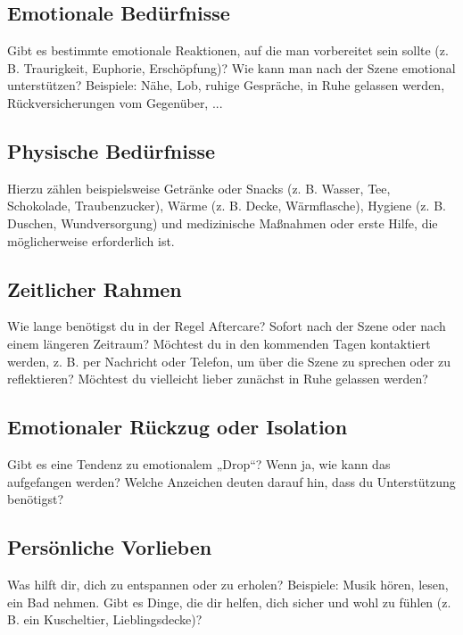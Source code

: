 \documentclass[a4paper,12pt]{article}
\begin{document}
\subsection{Emotionale Bedürfnisse}
\noindent Gibt es bestimmte emotionale Reaktionen, auf die man vorbereitet sein sollte (z. B. Traurigkeit, Euphorie, Erschöpfung)? Wie kann man nach der Szene emotional unterstützen? Beispiele: Nähe, Lob, ruhige Gespräche, in Ruhe gelassen werden, Rückversicherungen vom Gegenüber, ... \newline
\noindent \TextField[name=AftercareEmotional,multiline=true,height=7em, width=37em]{}

\subsection{Physische Bedürfnisse}
\noindent Hierzu zählen beispielsweise Getränke oder Snacks (z. B. Wasser, Tee, Schokolade, Traubenzucker), Wärme (z. B. Decke, Wärmflasche), Hygiene (z. B. Duschen, Wundversorgung) und medizinische Maßnahmen oder erste Hilfe, die möglicherweise erforderlich ist. \newline
\noindent \TextField[name=AftercarePhysisch,multiline=true,height=7em, width=37em]{}

\subsection{Zeitlicher Rahmen}
\noindent Wie lange benötigst du in der Regel Aftercare? Sofort nach der Szene oder nach einem längeren Zeitraum? Möchtest du in den kommenden Tagen kontaktiert werden, z. B. per Nachricht oder Telefon, um über die Szene zu sprechen oder zu reflektieren? Möchtest du vielleicht lieber zunächst in Ruhe gelassen werden? \newline
\noindent \TextField[name=AftercareZeitlich,multiline=true,height=7em, width=37em]{}

\subsection{Emotionaler Rückzug oder Isolation}
\noindent Gibt es eine Tendenz zu emotionalem „Drop“? Wenn ja, wie kann das aufgefangen werden? Welche Anzeichen deuten darauf hin, dass du Unterstützung benötigst? \newline
\noindent \TextField[name=AftercareDrop,multiline=true,height=7em, width=37em]{}

\subsection{Persönliche Vorlieben}
\noindent Was hilft dir, dich zu entspannen oder zu erholen? Beispiele: Musik hören, lesen, ein Bad nehmen. Gibt es Dinge, die dir helfen, dich sicher und wohl zu fühlen (z. B. ein Kuscheltier, Lieblingsdecke)? \newline
\noindent \TextField[name=AftercarePreference,multiline=true,height=7em, width=37em]{}
\end{document}
